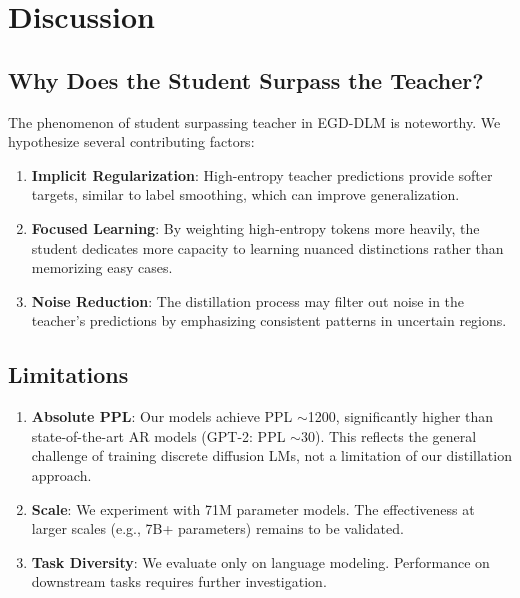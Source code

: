 \documentclass[conference]{IEEEtran}
\begin{document}
\section{Discussion}
\label{sec:discussion}

\subsection{Why Does the Student Surpass the Teacher?}

The phenomenon of student surpassing teacher in EGD-DLM is noteworthy. We hypothesize several contributing factors:

\begin{enumerate}
    \item \textbf{Implicit Regularization}: High-entropy teacher predictions provide softer targets, similar to label smoothing, which can improve generalization.

    \item \textbf{Focused Learning}: By weighting high-entropy tokens more heavily, the student dedicates more capacity to learning nuanced distinctions rather than memorizing easy cases.

    \item \textbf{Noise Reduction}: The distillation process may filter out noise in the teacher's predictions by emphasizing consistent patterns in uncertain regions.
\end{enumerate}

\subsection{Limitations}

\begin{enumerate}
    \item \textbf{Absolute PPL}: Our models achieve PPL $\sim$1200, significantly higher than state-of-the-art AR models (GPT-2: PPL $\sim$30). This reflects the general challenge of training discrete diffusion LMs, not a limitation of our distillation approach.

    \item \textbf{Scale}: We experiment with 71M parameter models. The effectiveness at larger scales (e.g., 7B+ parameters) remains to be validated.

    \item \textbf{Task Diversity}: We evaluate only on language modeling. Performance on downstream tasks requires further investigation.
\end{enumerate}
\end{document}
